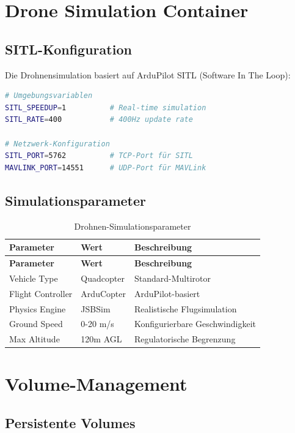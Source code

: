 \documentclass[11pt,a4paper]{article}
\begin{document}
\section{Drone Simulation Container}

\subsection{SITL-Konfiguration}

Die Drohnensimulation basiert auf ArduPilot SITL (Software In The Loop):

\begin{lstlisting}[language=bash, caption=SITL-Parameter]
# Umgebungsvariablen
SITL_SPEEDUP=1          # Real-time simulation
SITL_RATE=400           # 400Hz update rate

# Netzwerk-Konfiguration
SITL_PORT=5762          # TCP-Port für SITL
MAVLINK_PORT=14551      # UDP-Port für MAVLink
\end{lstlisting}

\subsection{Simulationsparameter}

\begin{longtable}{|l|l|l|}
\caption{Drohnen-Simulationsparameter} \\
\hline
\textbf{Parameter} & \textbf{Wert} & \textbf{Beschreibung} \\
\hline
\endfirsthead
\hline
\textbf{Parameter} & \textbf{Wert} & \textbf{Beschreibung} \\
\hline
\endhead
\hline
\endfoot
\hline
\endlastfoot

Vehicle Type & Quadcopter & Standard-Multirotor \\
Flight Controller & ArduCopter & ArduPilot-basiert \\
Physics Engine & JSBSim & Realistische Flugsimulation \\
Ground Speed & 0-20 m/s & Konfigurierbare Geschwindigkeit \\
Max Altitude & 120m AGL & Regulatorische Begrenzung \\
\end{longtable}

\section{Volume-Management}

\subsection{Persistente Volumes}
\end{document}

